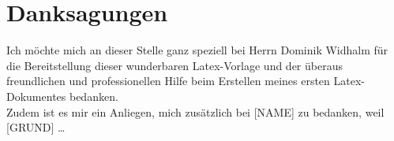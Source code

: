 \section*{Danksagungen}\thispagestyle{empty}
    \label{chap:acknowledgements}
    
    Ich möchte mich an dieser Stelle ganz speziell bei Herrn Dominik Widhalm für die Bereitstellung dieser wunderbaren Latex-Vorlage und der überaus freundlichen und professionellen Hilfe beim Erstellen meines ersten Latex-Dokumentes bedanken.\\[\baselineskip]
    Zudem ist es mir ein Anliegen, mich zusätzlich bei [NAME] zu bedanken, weil [GRUND] \ldots
